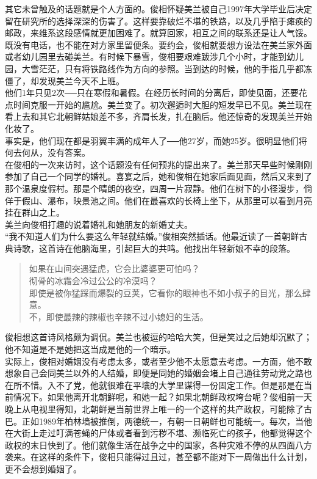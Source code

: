 其它未曾触及的话题就是个人方面的。俊相怀疑美兰被自己1997年大学毕业后决定留在研究所的选择深深的伤害了。这样要靠破烂不堪的铁路，以及几乎陷于瘫痪的邮政，来维系这段感情就更加困难了。就算回家，相互之间的联系还是让人气馁。既没有电话，也不能在对方家里留便条。要约会，俊相就要想方设法在美兰家外面或者幼儿园里去碰美兰。有时候下暴雪，俊相要艰难跋涉几个小时，才能到幼儿园，大雪茫茫，只有将铁路线作为方向的参照。当到达的时候，他的手指几乎都冻僵了，却发现美兰今天不上班。\\

他们1年只见2次──只在寒假和暑假。在经历长时间的分离后，即使见面，还要花点时间克服一开始的尴尬。美兰变了。初次邂逅时大胆的短发早已不见。美兰现在看上去和其它北朝鲜姑娘差不多，齐肩长发，扎在脑后。他还惊奇的发现美兰开始化妆了。\\

事实是，他们现在都是羽翼丰满的成年人了──他27岁，而她25岁。很明显他们将何去何从，没有答案。\\

在俊相的一次来访时，这个话题没有任何预兆的提出来了。美兰那天早些时候刚刚参加了自己一个同学的婚礼。喜宴之后，她和俊相在她家后面见面，然后又来到了那个温泉度假村。那是个晴朗的夜空，四周一片寂静。他们在树下的小径漫步，倘佯于假山、瀑布，映景池之间。他们在最喜欢的长椅上坐下，从那里可以看到月亮挂在群山之上。\\

美兰向俊相打趣的说着婚礼和她朋友的新婚丈夫。\\

“我不知道人们为什么要这么年轻就结婚。”俊相突然插话。他最近读了一首朝鲜古典诗歌，这首诗在他脑海里，引起巨大的共鸣。他找出年轻新娘不幸的段落。\\

\begin{quote}
	如果在山间突遇猛虎，它会比婆婆更可怕吗？\\

	彻骨的冰霜会冷过公公的冷漠吗？\\
	
	即使是被你猛踩而爆裂的豆荚，它看你的眼神也不如小叔子的目光，那么肆意。\\
	
	不，即使最辣的辣椒也辛辣不过小媳妇的生活。\\
\end{quote}

俊相想这首诗风格颇为调侃。美兰也被逗的哈哈大笑，但是笑过之后她却沉默了；他不知道是不是她把这当成是他的一个暗示。\\

实际上，俊相对婚姻没有考虑太多，或者至少他不太愿意去考虑。一方面，他不敢想象自己会同美兰以外的人结婚，即便是同她的婚姻会堵上自己通往劳动党之路也在所不惜。入不了党，他就很难在平壤的大学里谋得一份固定工作。但是那是在当前情况下。如果他离开北朝鲜呢，和她一起？如果北朝鲜政权垮台呢？俊相前一天晚上从电视里得知，北朝鲜是当前世界上唯一的一个这样的共产政权，可能除了古巴。正如1989年柏林墙被推倒，两德统一，有朝一日朝鲜也可能统一。每次，当他在大街上走过叮满苍蝇的尸体或者看到污秽不堪、濒临死亡的孩子，他都觉得这个政权的末日快到了。他们就像生活在战争之中的国家，各种灾难不停的从四面八方袭来。在这样的条件下，俊相只能得过且过，甚至都不能对下一周做出什么计划，更不会想到婚姻了。\\


